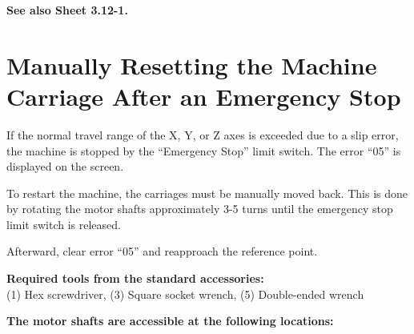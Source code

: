 \vspace{0.5cm}

\textbf{See also Sheet 3.12-1.}

\section{Manually Resetting the Machine Carriage After an Emergency Stop}

\setcounter{page}{2}
\setcounter{section}{15}

If the normal travel range of the X, Y, or Z axes is exceeded due to a slip error, the machine is stopped by the \enquote{Emergency Stop} limit switch. The error \enquote{05} is displayed on the screen.

To restart the machine, the carriages must be manually moved back. This is done by rotating the motor shafts approximately 3-5 turns until the emergency stop limit switch is released.

Afterward, clear error \enquote{05} and reapproach the reference point.

\vspace{.3cm}



\textbf{Required tools from the standard accessories:}\\
(1) Hex screwdriver, (3) Square socket wrench, (5) Double-ended wrench

\vspace{2cm}

\textbf{The motor shafts are accessible at the following locations:}  

